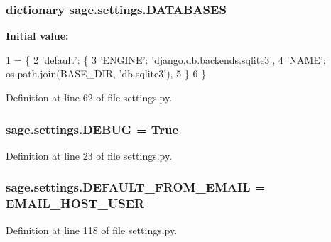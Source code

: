 \subsubsection[{D\+A\+T\+A\+B\+A\+S\+E\+S}]{\setlength{\rightskip}{0pt plus 5cm}dictionary sage.\+settings.\+D\+A\+T\+A\+B\+A\+S\+E\+S}\label{a00043_a870c10acdd1141ac92340ce3e50ffbbd}
{\bfseries Initial value\+:}
\begin{DoxyCode}
1 = \{
2     \textcolor{stringliteral}{'default'}: \{
3         \textcolor{stringliteral}{'ENGINE'}: \textcolor{stringliteral}{'django.db.backends.sqlite3'},
4         \textcolor{stringliteral}{'NAME'}: os.path.join(BASE\_DIR, \textcolor{stringliteral}{'db.sqlite3'}),
5     \}
6 \}
\end{DoxyCode}


Definition at line 62 of file settings.\+py.

\hypertarget{a00043_acc28086c56df6aed910b2552e07944cc}{}
\subsubsection[{D\+E\+B\+U\+G}]{\setlength{\rightskip}{0pt plus 5cm}sage.\+settings.\+D\+E\+B\+U\+G = True}\label{a00043_acc28086c56df6aed910b2552e07944cc}


Definition at line 23 of file settings.\+py.

\hypertarget{a00043_a6517c4f93850d63e2bdbe7040ad0e2ff}{}
\subsubsection[{D\+E\+F\+A\+U\+L\+T\+\_\+\+F\+R\+O\+M\+\_\+\+E\+M\+A\+I\+L}]{\setlength{\rightskip}{0pt plus 5cm}sage.\+settings.\+D\+E\+F\+A\+U\+L\+T\+\_\+\+F\+R\+O\+M\+\_\+\+E\+M\+A\+I\+L = {\bf E\+M\+A\+I\+L\+\_\+\+H\+O\+S\+T\+\_\+\+U\+S\+E\+R}}\label{a00043_a6517c4f93850d63e2bdbe7040ad0e2ff}


Definition at line 118 of file settings.\+py.

\hypertarget{a00043_a2d83ca0a279480aa03599465a0386b17}{}
